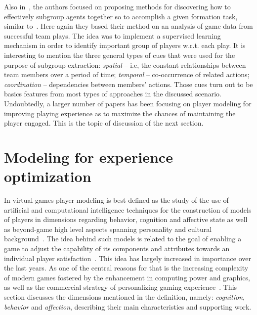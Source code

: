 Also in~\cite{laviersa2014using}, the authors focused on proposing methods for discovering how to effectively  subgroup agents together so to accomplish a given formation task, similar to~\cite{stone1999task}. Here again they based their method on an analysis of game data from successful team plays. The idea was to implement a supervised learning mechanism in order to identify important group of players w.r.t. each play. It is interesting to mention the three general types of cues that were used for the purpose of subgroup extraction: \textit{spatial} -- i.e, the constant relationships between team members over a period of time; \textit{temporal} -- co-occurrence of related actions; \textit{coordination} -- dependencies between members' actions. Those cues turn out to be basics features from most types of approaches in the discussed scenario. Undoubtedly, a larger number of papers has been focusing on player modeling for improving playing experience as to maximize the chances of maintaining the player engaged. This is the topic of discussion of the next section.


\section{Modeling for experience optimization}\label{expOptimization}
In virtual games player modeling is best defined as the study of the use of artificial and computational intelligence techniques for the construction of models of players in dimensions regarding behavior, cognition and affective state as well as beyond-game high level aspects spanning personality and cultural background~\cite{yannakakis2013player}. The idea behind such models is related to the goal of enabling a game to adjust the capability of its components and attributes towards an individual player satisfaction~\cite{Herik_opponentmodelling}. This idea has largely increased in importance over the last years. As one of the central reasons for that is the increasing complexity of modern games fostered by the enhancement in computing power and graphics, as well as the commercial strategy of personalizing gaming experience~\cite{teng2010customization, Herik_opponentmodelling}. This section discusses the dimensions mentioned in the definition, namely: \textit{cognition}, \textit{behavior} and \textit{affection}, describing their main characteristics and supporting work.

